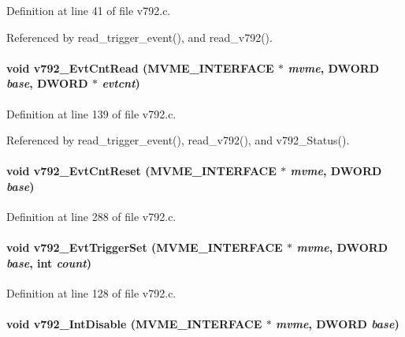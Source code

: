 Definition at line 41 of file v792.c.

Referenced by read\_\-trigger\_\-event(), and read\_\-v792().
\paragraph[{v792\_\-EvtCntRead}]{\setlength{\rightskip}{0pt plus 5cm}void v792\_\-EvtCntRead ({\bf MVME\_\-INTERFACE} $\ast$ {\em mvme}, \/  {\bf DWORD} {\em base}, \/  {\bf DWORD} $\ast$ {\em evtcnt})}\hfill\label{v792_8c_a93c9ec6788ab26b8dc1ca782761f91ac}


Definition at line 139 of file v792.c.

Referenced by read\_\-trigger\_\-event(), read\_\-v792(), and v792\_\-Status().
\paragraph[{v792\_\-EvtCntReset}]{\setlength{\rightskip}{0pt plus 5cm}void v792\_\-EvtCntReset ({\bf MVME\_\-INTERFACE} $\ast$ {\em mvme}, \/  {\bf DWORD} {\em base})}\hfill\label{v792_8c_ac55abf9ce7cd67d18ded979ab4b54fe9}


Definition at line 288 of file v792.c.
\paragraph[{v792\_\-EvtTriggerSet}]{\setlength{\rightskip}{0pt plus 5cm}void v792\_\-EvtTriggerSet ({\bf MVME\_\-INTERFACE} $\ast$ {\em mvme}, \/  {\bf DWORD} {\em base}, \/  int {\em count})}\hfill\label{v792_8c_a3b2bc7ff2f4b4ab41dbe834eba5516f1}


Definition at line 128 of file v792.c.
\paragraph[{v792\_\-IntDisable}]{\setlength{\rightskip}{0pt plus 5cm}void v792\_\-IntDisable ({\bf MVME\_\-INTERFACE} $\ast$ {\em mvme}, \/  {\bf DWORD} {\em base})}\hfill\label{v792_8c_a2ef8260ef4fe27e40837801320ffc617}


